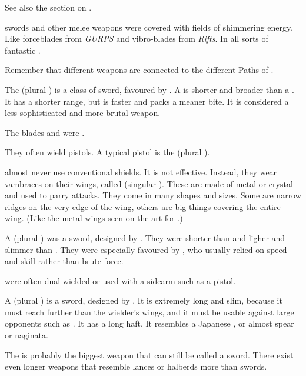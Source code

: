See also the section on . 

\Resphan swords and other melee weapons were covered with fields of shimmering energy.
Like forceblades from \emph{GURPS} and vibro-blades from \emph{Rifts}.
In all sorts of fantastic \colours. 

Remember that different weapons are connected to the different Paths of . 



\begin{gloss}
  \gitem[\belthradeth]{\belthrad}
  \index{\belthrad}
  The \belthrad{} (plural \belthradeth) is a class of sword, favoured by \Mystraacht. 
  A \belthrad{} is shorter and broader than a . 
  It has a shorter range, but is faster and packs a meaner bite. 
  It is considered a less sophisticated and more brutal weapon. 
  
  The blades  and  were \belthradeth. 
  
  
  
  \index{\ghijed}%
  They often wield pistols. 
  A typical \resphan{} pistol is the \ghijed{} (plural \ghijedeth). 
  
  
  
  \gitem[\kilghain]{\kilghan}
  \index{\kilghan}%
  \Resphain{} almost never use conventional shields. 
  It is not effective. 
  Instead, they wear vambraces on their wings, called \kilghain{} (singular \kilghan). 
  These are made of metal or crystal and used to parry attacks. 
  They come in many shapes and sizes.
  Some are narrow ridges on the very edge of the wing, others are big things covering the entire wing. 
  (Like the metal wings seen on the art for \cite{SymphonyX:ParadiseLost}.) 
  
  
  
  \gitem[\ruthiel]{\ruthil}
  A \ruthil{} (plural \ruthiel) was a \resphan{} sword, designed by \TiphredSerah. 
  They were shorter than \senain{} and ligher and slimmer than \belthradeth. 
  They were especially favoured by \resviel, who usually relied on speed and skill rather than brute force. 
  
  \Ruthiel{} were often dual-wielded or used with a sidearm such as a pistol. 
  
  
  
  \gitem[\senain]{\senaan}
  \index{\senaan}
  A \senaan{} (plural \senain) is a \resphan{} sword, designed by \CiriathSepher. 
  It is extremely long and slim, because it must reach further than the \resphan{} wielder's wings, and it must be usable against large opponents such as \dragons. 
  It has a long haft. 
  It resembles a Japanese \zanbatou, or almost spear or naginata. 
  
  The \senaan{} is probably the biggest \resphan{} weapon that can still be called a sword. 
  There exist even longer weapons that resemble lances or halberds more than swords. 
\end{gloss}
